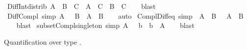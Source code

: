\begin{isabellebody}
\ Diff{\isacharunderscore}{\kern0pt}Int{\isacharunderscore}{\kern0pt}distrib{}{\isacharcolon}{\kern0pt}\ {\isachardoublequoteopen}{\isacharparenleft}{\kern0pt}A\ {\isacharminus}{\kern0pt}\ B{\isacharparenright}{\kern0pt}\ {\isasyminter}\ C\ {\isacharequal}{\kern0pt}\ {\isacharparenleft}{\kern0pt}A\ {\isasyminter}\ C{\isacharparenright}{\kern0pt}\ {\isacharminus}{\kern0pt}\ {\isacharparenleft}{\kern0pt}B\ {\isasyminter}\ C{\isacharparenright}{\kern0pt}{\isachardoublequoteclose}\isanewline
%
\isadelimproof
\ \ %
\endisadelimproof
%
\isatagproof
{}\isamarkupfalse%
\ blast%
\endisatagproof
{\isafoldproof}%
%
\isadelimproof
\isanewline
%
\endisadelimproof
\isanewline
{}\isamarkupfalse%
\ Diff{\isacharunderscore}{\kern0pt}Compl\ {\isacharbrackleft}{\kern0pt}simp{\isacharbrackright}{\kern0pt}{\isacharcolon}{\kern0pt}\ {\isachardoublequoteopen}A\ {\isacharminus}{\kern0pt}\ {\isacharparenleft}{\kern0pt}{\isacharminus}{\kern0pt}\ B{\isacharparenright}{\kern0pt}\ {\isacharequal}{\kern0pt}\ A\ {\isasyminter}\ B{\isachardoublequoteclose}\isanewline
%
\isadelimproof
\ \ %
\endisadelimproof
%
\isatagproof
{}\isamarkupfalse%
\ auto%
\endisatagproof
{\isafoldproof}%
%
\isadelimproof
\isanewline
%
\endisadelimproof
\isanewline
{}\isamarkupfalse%
\ Compl{\isacharunderscore}{\kern0pt}Diff{\isacharunderscore}{\kern0pt}eq\ {\isacharbrackleft}{\kern0pt}simp{\isacharbrackright}{\kern0pt}{\isacharcolon}{\kern0pt}\ {\isachardoublequoteopen}{\isacharminus}{\kern0pt}\ {\isacharparenleft}{\kern0pt}A\ {\isacharminus}{\kern0pt}\ B{\isacharparenright}{\kern0pt}\ {\isacharequal}{\kern0pt}\ {\isacharminus}{\kern0pt}\ A\ {\isasymunion}\ B{\isachardoublequoteclose}\isanewline
%
\isadelimproof
\ \ %
\endisadelimproof
%
\isatagproof
{}\isamarkupfalse%
\ blast%
\endisatagproof
{\isafoldproof}%
%
\isadelimproof
\isanewline
%
\endisadelimproof
\isanewline
{}\isamarkupfalse%
\ subset{\isacharunderscore}{\kern0pt}Compl{\isacharunderscore}{\kern0pt}singleton\ {\isacharbrackleft}{\kern0pt}simp{\isacharbrackright}{\kern0pt}{\isacharcolon}{\kern0pt}\ {\isachardoublequoteopen}A\ {\isasymsubseteq}\ {\isacharminus}{\kern0pt}\ {\isacharbraceleft}{\kern0pt}b{\isacharbraceright}{\kern0pt}\ {\isasymlongleftrightarrow}\ b\ {\isasymnotin}\ A{\isachardoublequoteclose}\isanewline
%
\isadelimproof
\ \ %
\endisadelimproof
%
\isatagproof
{}\isamarkupfalse%
\ blast%
\endisatagproof
{\isafoldproof}%
%
\isadelimproof
%
\endisadelimproof
%
\begin{isamarkuptext}%
\medskip Quantification over type .%

\end{isamarkuptext}
\end{isabellebody}
